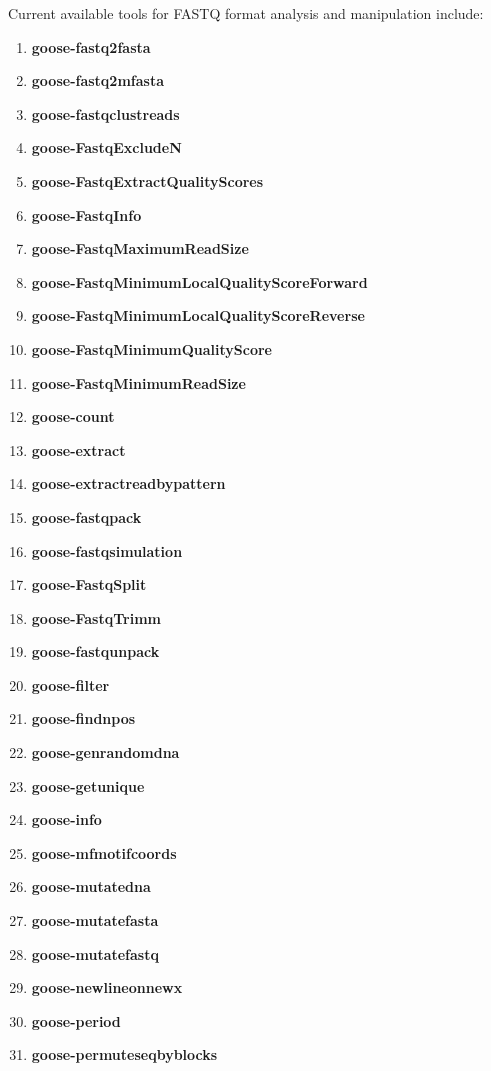 \documentclass[11pt,journal,compsoc]{report}[1]
\begin{document}
Current available tools for FASTQ format analysis and manipulation include:
\begin{enumerate}

\item \textbf{goose-fastq2fasta}
\item \textbf{goose-fastq2mfasta}
\item \textbf{goose-fastqclustreads}
\item \textbf{goose-FastqExcludeN}
\item \textbf{goose-FastqExtractQualityScores}
\item \textbf{goose-FastqInfo}
\item \textbf{goose-FastqMaximumReadSize}
\item \textbf{goose-FastqMinimumLocalQualityScoreForward}
\item \textbf{goose-FastqMinimumLocalQualityScoreReverse}
\item \textbf{goose-FastqMinimumQualityScore}
\item \textbf{goose-FastqMinimumReadSize}






\item \textbf{goose-count}
\item \textbf{goose-extract}
\item \textbf{goose-extractreadbypattern}



\item \textbf{goose-fastqpack}
\item \textbf{goose-fastqsimulation}
\item \textbf{goose-FastqSplit}
\item \textbf{goose-FastqTrimm}
\item \textbf{goose-fastqunpack}
\item \textbf{goose-filter}
\item \textbf{goose-findnpos}

\item \textbf{goose-genrandomdna}
\item \textbf{goose-getunique}
\item \textbf{goose-info}
\item \textbf{goose-mfmotifcoords}

\item \textbf{goose-mutatedna}
\item \textbf{goose-mutatefasta}
\item \textbf{goose-mutatefastq}
\item \textbf{goose-newlineonnewx}
\item \textbf{goose-period}
\item \textbf{goose-permuteseqbyblocks}


\end{enumerate}
\end{document}
